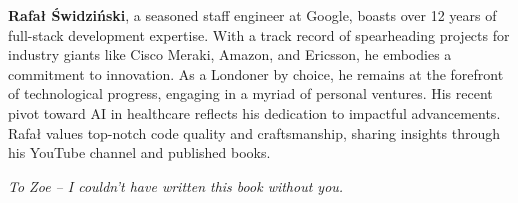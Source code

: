 \textbf{Rafał Świdziński}, a seasoned staff engineer at Google, boasts over 12 years of full-stack development expertise. With a track record of spearheading projects for industry giants like Cisco
Meraki, Amazon, and Ericsson, he embodies a commitment to innovation. As a Londoner by choice,
he remains at the forefront of technological progress, engaging in a myriad of personal ventures.
His recent pivot toward AI in healthcare reflects his dedication to impactful advancements. Rafał
values top-notch code quality and craftsmanship, sharing insights through his YouTube channel
and published books.

\textit{To Zoe – I couldn’t have written this book without you.}




